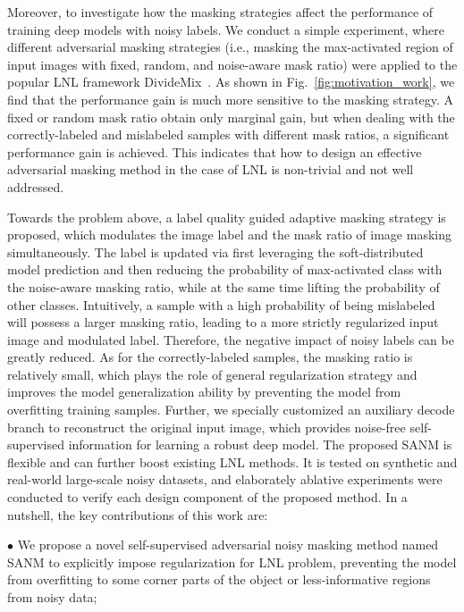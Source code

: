 \documentclass[10pt,twocolumn,letterpaper]{article}
\begin{document}
Moreover, {to investigate how the masking strategies affect the performance of training deep models with noisy labels. We conduct a simple experiment, where different adversarial masking strategies (i.e., masking the max-activated region of input images with fixed, random, and noise-aware mask ratio) were applied to the popular LNL framework DivideMix~\cite{li2020dividemix}.} As shown in Fig.~\ref{fig:motivation_work}, we find that the performance {gain} is much more sensitive to the masking strategy. {A fixed or random mask ratio obtain only marginal gain, but when dealing with the correctly-labeled and mislabeled samples with different mask ratios, a significant performance gain is achieved. This indicates that how to design an effective adversarial masking method in the case of LNL is non-trivial and not well addressed.}



{Towards the problem above, a label quality guided adaptive masking strategy is proposed,} which modulates the {image label and the mask ratio of image masking simultaneously}. {The label is updated via first leveraging the soft-distributed model prediction and then reducing the probability of max-activated class with the noise-aware masking ratio, while at the same time lifting the probability of other classes.}
Intuitively, a sample with a high probability of being mislabeled will possess a larger masking ratio, leading to a more strictly regularized input image and modulated label. Therefore, the negative impact of noisy labels can be greatly reduced. As for the correctly-labeled samples, the masking ratio is relatively small, which plays the role of general regularization strategy and improves the model generalization ability by preventing the model from overfitting training samples. Further, we {specially customized} an auxiliary decode branch to reconstruct the original input image, which provides noise-free self-supervised information for learning a robust deep model. The proposed SANM is flexible and can further boost existing LNL methods. It is tested on synthetic and real-world large-scale noisy datasets, and elaborately ablative experiments were conducted to verify each design component of the proposed method. In a nutshell, the key contributions of this work are:

$\bullet$ We propose a novel self-supervised adversarial noisy masking method named SANM to explicitly impose regularization {for LNL problem}, preventing the model from overfitting to {some corner parts of the object or less-informative regions from noisy data;}
\end{document}
